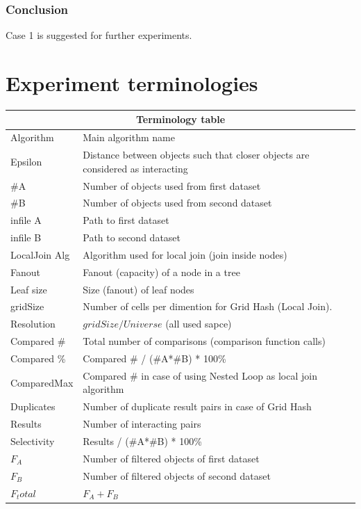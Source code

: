 \documentclass{sig-alternate}
\begin{document}
\subsubsection{Conclusion}
Case 1 is suggested for further experiments.

\section{Experiment terminologies}

\begin{table}
\centering
\begin{tabular}{ |l|l| }
  \hline
  \multicolumn{2}{|c|}{Terminology table} \\
  \hline
Algorithm	& Main algorithm name\\
Epsilon		& Distance between objects such that closer objects are considered as interacting\\
\#A		& Number of objects used from first dataset\\
\#B		& Number of objects used from second dataset\\
infile A	& Path to first dataset\\
infile B	& Path to second dataset\\
LocalJoin Alg	& Algorithm used for local join (join inside nodes)\\
Fanout		& Fanout (capacity) of a node in a tree\\
Leaf size	& Size (fanout) of leaf nodes\\
gridSize	& Number of cells per dimention for Grid Hash (Local Join).\\ Resolution & $gridSize/Universe$ (all used sapce)\\
Compared \#	& Total number of comparisons (comparison function calls)\\
Compared \%	& Compared \# / (\#A*\#B) * 100\%\\
ComparedMax	& Compared \# in case of using Nested Loop as local join algorithm\\
Duplicates	& Number of duplicate result pairs in case of Grid Hash\\
Results		& Number of interacting pairs\\
Selectivity	& Results / (\#A*\#B) * 100\%\\
$F_A$	& Number of filtered objects of first dataset\\
$F_B$	& Number of filtered objects of second dataset\\
$F_total$	& $F_A + F_B$\\

\end{tabular}
\end{table}
\end{document}

